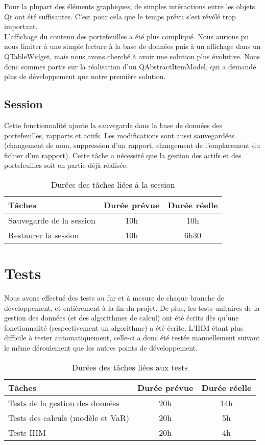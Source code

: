\documentclass[a4paper]{report}
\begin{document}
Pour la plupart des éléments graphiques, de simples intéractions entre les objets Qt ont été suffisantes.
C'est pour cela que le temps prévu s'est révélé trop important.\\

L'affichage du contenu des portefeuilles a été plus compliqué.
Nous aurions pu nous limiter à une simple lecture à la base de données puis à un affichage dans un QTableWidget, mais nous avons cherché à avoir une solution plus évolutive. Nous donc sommes partis sur la réalisation d'un QAbstractItemModel, qui a demandé plus de développement que notre première solution.

\section{Session}
Cette fonctionnalité ajoute la sauvegarde dans la base de données des portefeuilles, rapports et actifs.
Les modifications sont aussi sauvegardées (changement de nom, suppression d'un rapport, changement de l'emplacement du fichier d'un rapport).
Cette tâche a nécessité que la gestion des actifs et des portefeuilles soit en partie déjà réalisée.


\begin{table}[H]
\centering
  \begin{tabularx}{0.8\textwidth}{| X | c | c |}
    \hline
	Tâches & Durée prévue & Durée réelle \\
    \hline
    Sauvegarde de la session &  10h & 10h\\
    Restaurer la session &  10h & 6h30\\
    \hline
  \end{tabularx}
  \caption{Durées des tâches liées à la session}
\end{table}


\chapter{Tests}

Nous avons effectué des tests au fur et à mesure de chaque branche de développement, et entièrement à la fin du projet.
De plus, les tests unitaires de la gestion des données (et des algorithmes de calcul) ont été écrits dès qu'une fonctionnalité (respectivement un algorithme) a été écrite.
L'IHM étant plus difficile à tester automatiquement, celle-ci a donc été testée manuellement suivant le même déroulement que les autres points de développement.


\begin{table}[H]
\centering
  \begin{tabularx}{0.8\textwidth}{| X | c | c |}
    \hline
	Tâches & Durée prévue & Durée réelle \\
    \hline
    Tests de la gestion des données & 20h & 14h\\
    Tests des calculs (modèle et VaR) & 20h & 5h\\
    Tests IHM & 20h & 4h\\
    \hline
  \end{tabularx}
  \caption{Durées des tâches liées aux tests}
\end{table}
\end{document}

